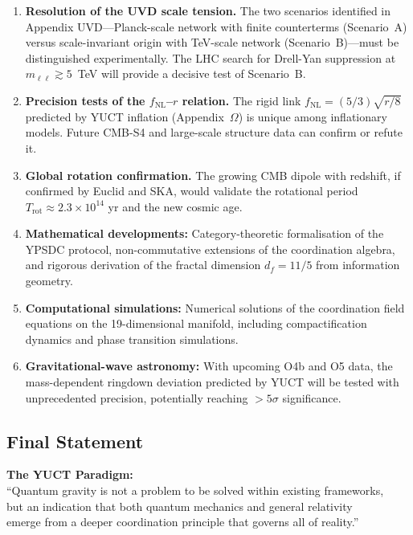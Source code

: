 \documentclass[12pt,a4paper]{article}
\theoremstyle{remark}
\begin{document}
\begin{enumerate}
	\item \textbf{Resolution of the UVD scale tension.} The two scenarios
	identified in Appendix UVD---Planck-scale network with finite counterterms
	(Scenario~A) versus scale-invariant origin with TeV-scale network
	(Scenario~B)---must be distinguished experimentally. The LHC search for
	Drell-Yan suppression at $m_{\ell\ell}\gtrsim5$~TeV will provide a decisive
	test of Scenario~B.
	
	\item \textbf{Precision tests of the $f_{\mathrm{NL}}$--$r$ relation.}
	The rigid link $f_{\mathrm{NL}}=(5/3)\sqrt{r/8}$ predicted by YUCT
	inflation (Appendix~$\Omega$) is unique among inflationary models.
	Future CMB-S4 and large-scale structure data can confirm or refute it.
	
	\item \textbf{Global rotation confirmation.} The growing CMB dipole with
	redshift, if confirmed by Euclid and SKA, would validate the rotational
	period $T_{\mathrm{rot}}\approx2.3\times10^{14}$ yr and the new cosmic age.
	
	\item \textbf{Mathematical developments:} Category-theoretic formalisation
	of the YPSDC protocol, non-commutative extensions of the coordination
	algebra, and rigorous derivation of the fractal dimension $d_f=11/5$ from
	information geometry.
	
	\item \textbf{Computational simulations:} Numerical solutions of the
	coordination field equations on the 19-dimensional manifold, including
	compactification dynamics and phase transition simulations.
	
	\item \textbf{Gravitational-wave astronomy:} With upcoming O4b and O5 data,
	the mass-dependent ringdown deviation predicted by YUCT will be tested with
	unprecedented precision, potentially reaching $>5\sigma$ significance.
\end{enumerate}
	
	\subsection{Final Statement}
	
	\begin{center}
		\textbf{The YUCT Paradigm:}\\
		``Quantum gravity is not a problem to be solved within existing frameworks,\\
		but an indication that both quantum mechanics and general relativity\\
		emerge from a deeper coordination principle that governs all of reality.''
	\end{center}
	
\end{document}
